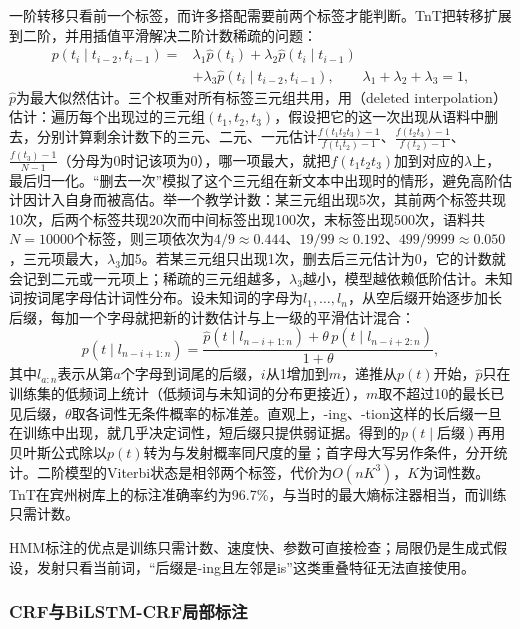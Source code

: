 一阶转移只看前一个标签，而许多搭配需要前两个标签才能判断。TnT把转移扩展到二阶，并用插值平滑解决二阶计数稀疏的问题：
\begin{equation}
  \begin{aligned}
    p(t_i\mid t_{i-2},t_{i-1})={}&\lambda_1\hat p(t_i)+\lambda_2\hat p(t_i\mid t_{i-1})\\
    &+\lambda_3\hat p(t_i\mid t_{i-2},t_{i-1}),\qquad\lambda_1+\lambda_2+\lambda_3=1,
  \end{aligned}
  \label{eq:nlp-analysis-tnt}
\end{equation}
$\hat p$为最大似然估计。三个权重对所有标签三元组共用，用（deleted interpolation）估计：遍历每个出现过的三元组$(t_1,t_2,t_3)$，假设把它的这一次出现从语料中删去，分别计算剩余计数下的三元、二元、一元估计$\frac{f(t_1t_2t_3)-1}{f(t_1t_2)-1}$、$\frac{f(t_2t_3)-1}{f(t_2)-1}$、$\frac{f(t_3)-1}{N-1}$（分母为0时记该项为0），哪一项最大，就把$f(t_1t_2t_3)$加到对应的$\lambda$上，最后归一化。“删去一次”模拟了这个三元组在新文本中出现时的情形，避免高阶估计因计入自身而被高估。举一个教学计数：某三元组出现5次，其前两个标签共现10次，后两个标签共现20次而中间标签出现100次，末标签出现500次，语料共$N=10000$个标签，则三项依次为$4/9\approx0.444$、$19/99\approx0.192$、$499/9999\approx0.050$，三元项最大，$\lambda_3$加5。若某三元组只出现1次，删去后三元估计为0，它的计数就会记到二元或一元项上；稀疏的三元组越多，$\lambda_3$越小，模型越依赖低阶估计。未知词按词尾字母估计词性分布。设未知词的字母为$l_1,\ldots,l_n$，从空后缀开始逐步加长后缀，每加一个字母就把新的计数估计与上一级的平滑估计混合：
\[
  p(t\mid l_{n-i+1:n})=\frac{\hat p(t\mid l_{n-i+1:n})+\theta\,p(t\mid l_{n-i+2:n})}{1+\theta},
\]
其中$l_{a:n}$表示从第$a$个字母到词尾的后缀，$i$从1增加到$m$，递推从$p(t)$开始，$\hat p$只在训练集的低频词上统计（低频词与未知词的分布更接近），$m$取不超过10的最长已见后缀，$\theta$取各词性无条件概率的标准差。直观上，-ing、-tion这样的长后缀一旦在训练中出现，就几乎决定词性，短后缀只提供弱证据。得到的$p(t\mid\text{后缀})$再用贝叶斯公式除以$p(t)$转为与发射概率同尺度的量；首字母大写另作条件，分开统计。二阶模型的Viterbi状态是相邻两个标签，代价为$O(nK^3)$，$K$为词性数。TnT在宾州树库上的标注准确率约为96.7\%，与当时的最大熵标注器相当，而训练只需计数。

HMM标注的优点是训练只需计数、速度快、参数可直接检查；局限仍是生成式假设，发射只看当前词，“后缀是-ing且左邻是is”这类重叠特征无法直接使用。

\subsubsection{CRF与BiLSTM-CRF局部标注}
\label{sec:nlp-analysis-crf-chunk}

